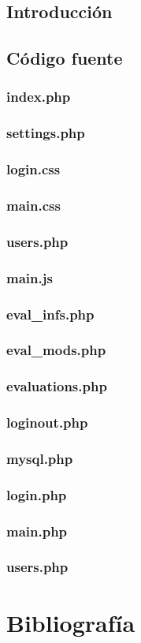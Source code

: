 \documentclass[12pt,a4paper,spanish,twoside]{article}
\begin{document}
\subsection{Introducción}
\subsection{Código fuente}
\subsubsection{index.php}

\subsubsection{settings.php}

\subsubsection{login.css}

\subsubsection{main.css}

\subsubsection{users.php}

\subsubsection{main.js}

\subsubsection{eval\_infs.php}

\subsubsection{eval\_mods.php}

\subsubsection{evaluations.php}

\subsubsection{loginout.php}

\subsubsection{mysql.php}

\subsubsection{login.php}

\subsubsection{main.php}

\subsubsection{users.php}


\section{Bibliografía}
\end{document}
